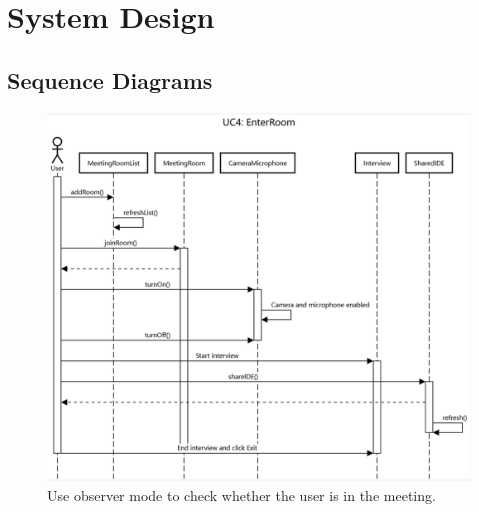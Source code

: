 \documentclass{article}
\begin{document}
\section{System Design}

\subsection{Sequence Diagrams}

\begin{figure}[H]
  \center
  \includegraphics[scale=0.21]{diagrams/UC4.png}
  \caption{Use observer mode to check whether the user is in the meeting.}
\end{figure}
\end{document}
